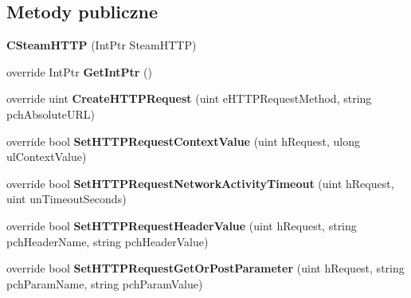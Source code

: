 \subsection*{Metody publiczne}
\begin{DoxyCompactItemize}
\item 
\mbox{\label{class_valve_1_1_steamworks_1_1_c_steam_h_t_t_p_acba8ea39452953e95ebad06723c674b0}} 
{\bfseries C\+Steam\+H\+T\+TP} (Int\+Ptr Steam\+H\+T\+TP)
\item 
\mbox{\label{class_valve_1_1_steamworks_1_1_c_steam_h_t_t_p_af21c352eea493bd76bdaa2a83a0e54f7}} 
override Int\+Ptr {\bfseries Get\+Int\+Ptr} ()
\item 
\mbox{\label{class_valve_1_1_steamworks_1_1_c_steam_h_t_t_p_a6a5ce99b485df0037cea40c9b3a02e1d}} 
override uint {\bfseries Create\+H\+T\+T\+P\+Request} (uint e\+H\+T\+T\+P\+Request\+Method, string pch\+Absolute\+U\+RL)
\item 
\mbox{\label{class_valve_1_1_steamworks_1_1_c_steam_h_t_t_p_a5e43d6a0321fce79788ee051705866c9}} 
override bool {\bfseries Set\+H\+T\+T\+P\+Request\+Context\+Value} (uint h\+Request, ulong ul\+Context\+Value)
\item 
\mbox{\label{class_valve_1_1_steamworks_1_1_c_steam_h_t_t_p_a21959adf6e170f5acd5168b1d76a1d1e}} 
override bool {\bfseries Set\+H\+T\+T\+P\+Request\+Network\+Activity\+Timeout} (uint h\+Request, uint un\+Timeout\+Seconds)
\item 
\mbox{\label{class_valve_1_1_steamworks_1_1_c_steam_h_t_t_p_a2159e9484c5186af3424d72fa8b2c181}} 
override bool {\bfseries Set\+H\+T\+T\+P\+Request\+Header\+Value} (uint h\+Request, string pch\+Header\+Name, string pch\+Header\+Value)
\item 
\mbox{\label{class_valve_1_1_steamworks_1_1_c_steam_h_t_t_p_a4449744cc4d6f22cc28aa77c376f5aec}} 
override bool {\bfseries Set\+H\+T\+T\+P\+Request\+Get\+Or\+Post\+Parameter} (uint h\+Request, string pch\+Param\+Name, string pch\+Param\+Value)

\end{DoxyCompactItemize}
